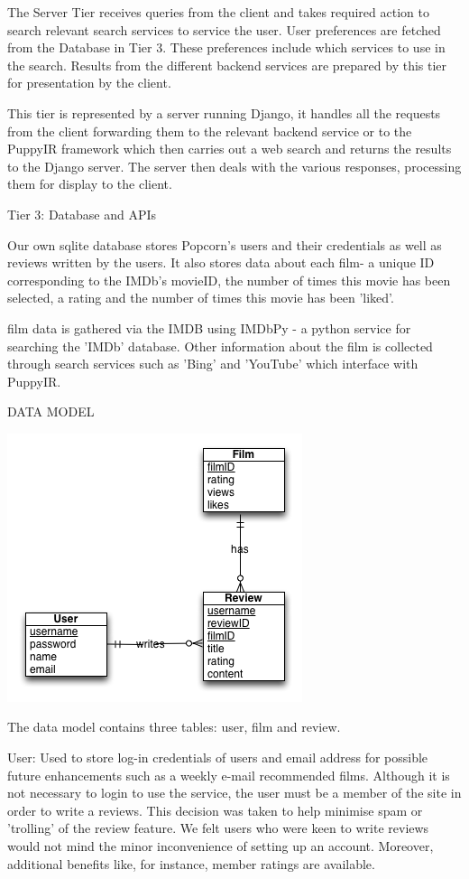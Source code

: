 \documentclass{sig-alt-release2}
\begin{document}
The Server Tier receives queries from the client and takes required action to search relevant search services to service the user. User preferences are fetched from the Database in Tier 3. These preferences include which services to use in the search. Results from the different backend services are prepared by this tier for presentation by the client. 
 
This tier is represented by a server running Django, it handles all the requests from the client forwarding them to the relevant backend service or to the PuppyIR framework which then carries out a web search and returns the results to the Django server. The server then deals with the various responses, processing them for display to the client. 
 
Tier 3: Database and APIs 
 
Our own sqlite database stores Popcorn's users and their credentials as well as reviews written by the users. It also stores data about each film- a unique ID corresponding to the IMDb's movieID, the number of times this movie has been selected, a rating and the number of times this movie has been 'liked'. 
 
film data is gathered via the IMDB using IMDbPy - a python service for searching the 'IMDb' database. Other information about the film is collected through search services such as 'Bing' and 'YouTube' which interface with PuppyIR. 
 
 
DATA MODEL

\includegraphics[scale=0.6]{erdiagram.png}
 
The data model contains three tables: user, film and review. 
 
User: Used to store log-in credentials of users and email address for possible future enhancements such as a weekly e-mail recommended films. Although it is not necessary to login to use the service, the user must be a member of the site in order to write a reviews. This decision was taken to help minimise spam or 'trolling' of the review feature. We felt users who were keen to write reviews would not mind the minor inconvenience of setting up an account. Moreover, additional benefits like, for instance, member ratings are available. 
 
\end{document}
